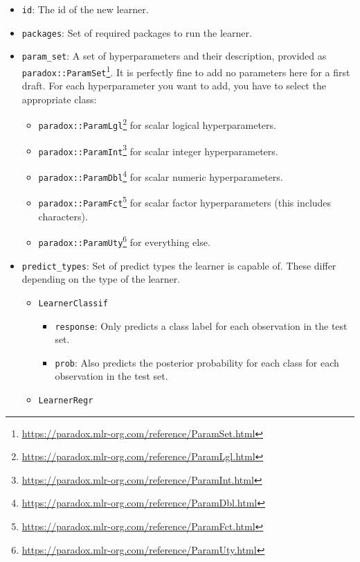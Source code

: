 \documentclass[12pt,]{scrbook}
\providecommand{\tightlist}{%
  \setlength{\itemsep}{0pt}\setlength{\parskip}{0pt}}
\renewcommand{\href}[2]{#2\footnote{\url{#1}}}
\begin{document}
\begin{itemize}
\tightlist
\item
  \texttt{id}: The id of the new learner.
\item
  \texttt{packages}: Set of required packages to run the learner.
\item
  \texttt{param\_set}: A set of hyperparameters and their description, provided as \href{https://paradox.mlr-org.com/reference/ParamSet.html}{\texttt{paradox::ParamSet}}.
  It is perfectly fine to add no parameters here for a first draft.
  For each hyperparameter you want to add, you have to select the appropriate class:

  \begin{itemize}
  \tightlist
  \item
    \href{https://paradox.mlr-org.com/reference/ParamLgl.html}{\texttt{paradox::ParamLgl}} for scalar logical hyperparameters.
  \item
    \href{https://paradox.mlr-org.com/reference/ParamInt.html}{\texttt{paradox::ParamInt}} for scalar integer hyperparameters.
  \item
    \href{https://paradox.mlr-org.com/reference/ParamDbl.html}{\texttt{paradox::ParamDbl}} for scalar numeric hyperparameters.
  \item
    \href{https://paradox.mlr-org.com/reference/ParamFct.html}{\texttt{paradox::ParamFct}} for scalar factor hyperparameters (this includes characters).
  \item
    \href{https://paradox.mlr-org.com/reference/ParamUty.html}{\texttt{paradox::ParamUty}} for everything else.
  \end{itemize}
\item
  \texttt{predict\_types}: Set of predict types the learner is capable of.
  These differ depending on the type of the learner.

  \begin{itemize}
  \tightlist
  \item
    \texttt{LearnerClassif}

    \begin{itemize}
    \tightlist
    \item
      \texttt{response}: Only predicts a class label for each observation in the test set.
    \item
      \texttt{prob}: Also predicts the posterior probability for each class for each observation in the test set.
    \end{itemize}
  \item
    \texttt{LearnerRegr}


\end{itemize}
\end{itemize}
\end{document}
